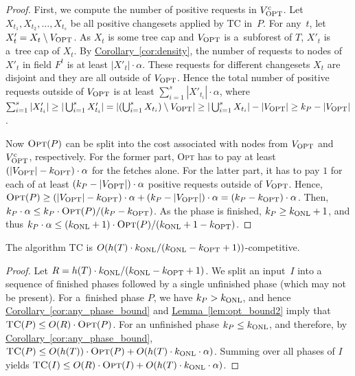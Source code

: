 \documentclass[sigconf,screen=true]{acmart}
\newcommand{\lref}[2][]{\hyperref[#2]{#1~\ref*{#2}}}
\newcommand{\ALG}{\textsc{TC}\xspace}
\newcommand{\OPT}{\textsc{Opt}\xspace}
\newcommand{\kALG}{k_\textnormal{ONL}}
\newcommand{\kOPT}{k_\textnormal{OPT}}
\newcommand{\VOPT}{V_\textnormal{OPT}}
\newcommand{\VOPTC}{V_\textnormal{OPT}^\textrm{c}}
\begin{document}
\begin{proof}
First, we compute the number of positive requests in $\VOPTC$. Let $X_{t_1},
X_{t_2}, \ldots, X_{t_s}$ be all positive changesets applied by \ALG in~$P$.
For any~$t$, let $X'_t = X_t \setminus \VOPT$. As $X_t$ is some tree cap and
$\VOPT$ is a~subforest of $T$, $X'_t$ is a~tree cap of $X_t$. By
\lref[Corollary]{cor:density}, the number of requests to nodes of $X'_t$ in
field $F^t$ is at least $|X'_t| \cdot \alpha$. These requests for different
changesets $X_t$ are disjoint and they are all outside of $\VOPT$. Hence the
total number of positive requests outside of $\VOPT$ is at least $\sum_{i=1}^s
|X'_{t_i}| \cdot \alpha$, where $\sum_{i=1}^s |X'_{t_i}| \geq |\bigcup_{i=1}^s
X'_{t_i}| = |(\bigcup_{i=1}^s X_{t_i}) \setminus \VOPT| \geq |\bigcup_{i=1}^s
X_{t_i}| - |\VOPT| \geq k_P - |\VOPT|$.

Now $\OPT(P)$ can be split into the cost associated with nodes from $\VOPT$
and $\VOPTC$, respectively. For the former part,
\OPT has to pay at least $(|\VOPT| - \kOPT) \cdot \alpha$ for the fetches
alone. For the latter part, it has to pay $1$ for each of at least $(k_P -
|\VOPT|) \cdot \alpha$ positive requests outside of $\VOPT$. Hence, $\OPT(P)
\geq (|\VOPT| - \kOPT) \cdot \alpha + (k_P - |\VOPT|) \cdot \alpha = (k_P -
\kOPT) \cdot \alpha$. Then, $k_P \cdot \alpha \leq k_P \cdot \OPT(P) / (k_P -
\kOPT)$. As the phase is finished, $k_P \geq \kALG + 1$, and thus $k_P \cdot
\alpha \leq (\kALG + 1) \cdot \OPT(P) / (\kALG + 1 - \kOPT)$.
\end{proof}



\begin{theorem}
The algorithm \ALG is $O(h(T) \cdot \kALG/(\kALG-\kOPT+1))$-competitive.
\end{theorem}

\begin{proof}
Let $R = h(T) \cdot \kALG/(\kALG-\kOPT+1)$. We split an input~$I$ into a
sequence of finished phases followed by a single unfinished phase (which may
not be present). For a~finished phase $P$, we have $k_P > \kALG$, and hence
\lref[Corollary]{cor:any_phase_bound} and \lref[Lemma]{lem:opt_bound2}
imply that $\ALG(P) \leq O(R) \cdot \OPT(P)$. For an unfinished phase $k_P
\leq \kALG$, and therefore, by \lref[Corollary]{cor:any_phase_bound}, $\ALG(P)
\leq O(h(T)) \cdot \OPT(P) + O(h(T) \cdot \kALG \cdot \alpha)$. Summing over
all phases of $I$ yields $\ALG(I) \leq O(R) \cdot \OPT(I) + O(h(T) \cdot \kALG
\cdot \alpha)$.
\end{proof}
\end{document}
